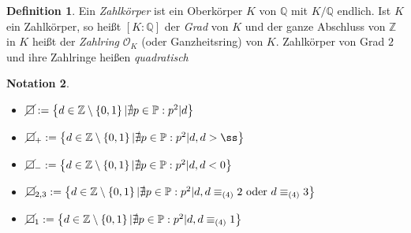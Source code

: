 \documentclass[
twoside=semi,
fontsize=12,
DIV=12, 
cleardoublepage=current,
leqno,
headings=optiontoheadandtoc, 
toc=idx
]{scrbook}
\newcommand{\Z}{\mathbb{Z}}
\newcommand{\Q}{\mathbb{Q}}
\renewcommand{\P}{\mathbb{P}}
\newcommand{\nsquare}{\cancel{\square}}
\newcommand{\set}[1]{\left\{ #1 \right\}}
\theoremstyle{definition}
\newtheorem{definition}{Definition}[section]
\newtheorem{notation}[definition]{Notation}
\begin{document}
 	\begin{definition}\label{2.1.15}
 		Ein \emph{Zahlk\"orper} ist ein Oberk\"orper $K$ von $\Q$ mit $K/\Q$ endlich. Ist $K$ ein Zahlk\"orper, so hei\ss t $[K:\Q]$ der \emph{Grad} von $K$ und der ganze Abschluss von $\Z$ in $K$ hei\ss t der \emph{Zahlring} $\mathcal{O}_K$ (oder Ganzheitsring) von $K$. Zahlk\"orper von Grad $2$ und ihre Zahlringe hei\ss en \emph{quadratisch} 
 	\end{definition}
 
 	\begin{notation}\label{2.1.16}
 		
 		\begin{itemize}
 			\item $\nsquare := \set{d\in\Z \setminus\set{0,1}| \nexists p \in \P: p^2|d}$
 			\item $\nsquare_+ := \set{d\in\Z \setminus\set{0,1}| \nexists p \in \P: p^2|d, d > ß}$
 			\item $\nsquare_- := \set{d\in\Z \setminus\set{0,1}| \nexists p \in \P: p^2|d, d < 0}$
 			\item $\nsquare_{2,3} := \set{d\in\Z \setminus\set{0,1}| \nexists p \in \P: p^2|d, d \equiv_{(4)} 2 \textrm{ oder } d \equiv_{(4)} 3 } $
 			\item $\nsquare_{1} := \set{d\in\Z \setminus\set{0,1}| \nexists p \in \P: p^2|d, d \equiv_{(4)} 1 } $
 		\end{itemize}
 	\end{notation}
 
\end{document}
